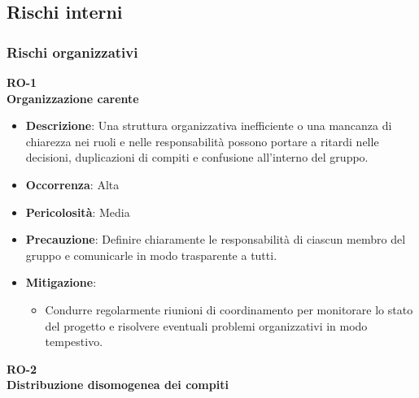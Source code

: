 \documentclass[5pt]{article}
\begin{document}
  \subsection{Rischi interni}
    \subsubsection{Rischi organizzativi}
      \textbf{RO-1}\\
      \textbf{Organizzazione carente}
      \begin{itemize}
        \item \textbf{Descrizione}: Una struttura organizzativa inefficiente o una mancanza di chiarezza nei ruoli e nelle responsabilità possono portare a ritardi nelle decisioni, duplicazioni di compiti e confusione all'interno del gruppo.
        \item \textbf{Occorrenza}: Alta
        \item \textbf{Pericolosità}: Media
        \item \textbf{Precauzione}: Definire chiaramente le responsabilità di ciascun membro del gruppo e comunicarle in modo trasparente a tutti.
        \item \textbf{Mitigazione}: 
          \begin{itemize}
            \item Condurre regolarmente riunioni di coordinamento per monitorare lo stato del progetto e risolvere eventuali problemi organizzativi in modo tempestivo.
          \end{itemize}
      \end{itemize}
      \textbf{RO-2}\\
      \textbf{Distribuzione disomogenea dei compiti}
\end{document}
